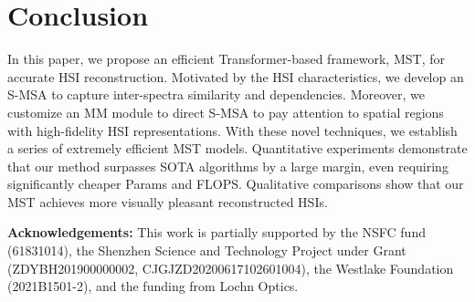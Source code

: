 \documentclass[10pt,twocolumn,letterpaper]{article}
\begin{document}
\section{Conclusion}
\vspace{-1.5mm}
In this paper, we propose an efficient Transformer-based framework, MST, for accurate HSI reconstruction. Motivated by the HSI characteristics, we develop an S-MSA to capture inter-spectra similarity and dependencies. Moreover, we customize an MM module to direct S-MSA to pay attention to spatial regions with high-fidelity HSI representations. With these novel techniques, we establish a series of extremely efficient MST models. Quantitative experiments demonstrate that our method surpasses SOTA algorithms by a large margin, even requiring significantly cheaper Params and FLOPS. Qualitative comparisons show that our MST achieves more visually pleasant reconstructed HSIs. 

\vspace{1.5mm}

\noindent \textbf{Acknowledgements:} This work is partially supported by the NSFC fund (61831014), the Shenzhen Science and Technology Project under Grant (ZDYBH201900000002, CJGJZD20200617102601004), the Westlake Foundation (2021B1501-2), and the funding from Lochn Optics.

{\small


}
\end{document}
